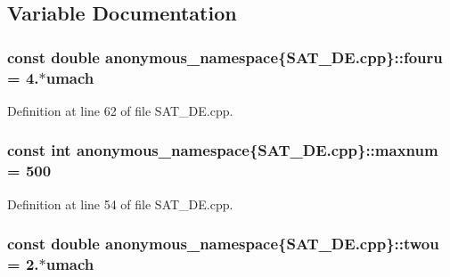\subsection{Variable Documentation}
\hypertarget{namespaceanonymous__namespace_02SAT__DE_8cpp_03_a5299ad0fd8f5e34ef1ef5a2e5acdaa2c}{
\subsubsection[{fouru}]{\setlength{\rightskip}{0pt plus 5cm}const double anonymous\-\_\-namespace\{S\-A\-T\-\_\-\-D\-E.\-cpp\}\-::fouru = 4.$\ast${\bf umach}}}\label{namespaceanonymous__namespace_02SAT__DE_8cpp_03_a5299ad0fd8f5e34ef1ef5a2e5acdaa2c}


Definition at line 62 of file S\-A\-T\-\_\-\-D\-E.\-cpp.

\hypertarget{namespaceanonymous__namespace_02SAT__DE_8cpp_03_a0ed7041d585ca8647b8bff9a4d9d62e6}{
\subsubsection[{maxnum}]{\setlength{\rightskip}{0pt plus 5cm}const int anonymous\-\_\-namespace\{S\-A\-T\-\_\-\-D\-E.\-cpp\}\-::maxnum = 500}}\label{namespaceanonymous__namespace_02SAT__DE_8cpp_03_a0ed7041d585ca8647b8bff9a4d9d62e6}


Definition at line 54 of file S\-A\-T\-\_\-\-D\-E.\-cpp.

\hypertarget{namespaceanonymous__namespace_02SAT__DE_8cpp_03_ac7d697ccca057a8340590bebf83de9f7}{
\subsubsection[{twou}]{\setlength{\rightskip}{0pt plus 5cm}const double anonymous\-\_\-namespace\{S\-A\-T\-\_\-\-D\-E.\-cpp\}\-::twou = 2.$\ast${\bf umach}}}\label{namespaceanonymous__namespace_02SAT__DE_8cpp_03_ac7d697ccca057a8340590bebf83de9f7}


